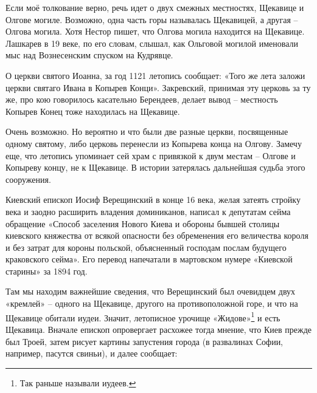 Если моё толкование верно, речь идет о двух смежных местностях, Щекавице и Олгове могиле. Возможно, одна часть горы называлась Щекавицей, а другая – Олгова могила. Хотя Нестор пишет, что Олгова могила находится на Щекавице. Лашкарев в 19 веке, по его словам, слышал, как Ольговой могилой именовали мыс над Вознесенским спуском на Кудрявце.

О церкви святого Иоанна, за год 1121 летопись сообщает: «Того же лета заложи церкви святаго Ивана в Копырев Конци». Закревский, принимая эту церковь за ту же, про кою говорилось касательно Берендеев, делает вывод – местность Копырев Конец тоже находилась на Щекавице.

Очень возможно. Но вероятно и что были две разные церкви, посвященные одному святому, либо церковь перенесли из Копырева конца на Олгову. Замечу еще, что летопись упоминает сей храм с привязкой к двум местам – Олгове и Копыреву концу, не к Щекавице. В истории затерялась дальнейшая судьба этого сооружения.

Киевский епископ Иосиф Верещинский в конце 16 века, желая затеять стройку века и заодно расширить владения доминиканов, написал к депутатам сейма обращение «Способ заселения Нового Киева и обороны бывшей столицы киевского княжества от всякой опасности без обременения его величества короля и без затрат для короны польской, объясненный господам послам будущего краковского сейма». Его перевод напечатали в мартовском нумере «Киевской старины» за 1894 год.

Там мы находим важнейшие сведения, что Верещинский был очевидцем двух «кремлей» – одного на Щекавице, другого на противоположной горе, и что на Щекавице обитали иудеи. Значит, летописное урочище «Жидове»\footnote{Так раньше называли иудеев.} и есть Щекавица. Вначале епископ опровергает расхожее тогда мнение, что Киев прежде был Троей, затем рисует картины запустения города (в развалинах Софии, например, пасутся свиньи), и далее сообщает:  

